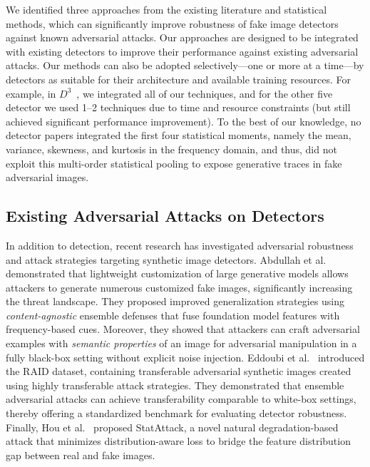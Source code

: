 \documentclass[letterpaper,twocolumn,10pt]{article}
\newcommand{\subhead}[1]{\vspace{1pt}\noindent{\textbf{#1.}}}
\begin{document}
\subhead{Novelty of our techniques}
We identified three approaches from the existing literature and statistical methods, which can significantly improve robustness of fake image detectors against known adversarial attacks. Our approaches are designed to be integrated with existing detectors to improve their performance against existing adversarial attacks. Our methods can also be adopted selectively---one or more at a time---by detectors as suitable for their architecture and available training resources.
For example, in $D^3$~\cite{yang2025d3}, we integrated all of our techniques, and for the other five detector we used 1--2 techniques due to time and resource constraints (but still achieved significant performance improvement). 
To the best of our knowledge, no detector papers integrated the first four statistical moments, namely the mean, variance, skewness,  and kurtosis 
in the frequency domain, and thus, did not exploit this multi-order statistical pooling to expose generative traces in fake adversarial images.

\subsection{Existing Adversarial Attacks on Detectors}
In addition to detection, recent research has investigated adversarial robustness and attack strategies targeting synthetic image detectors. Abdullah et al.~\cite{Sifat2024evolvingthreat} demonstrated that lightweight customization of large generative models allows attackers to generate numerous customized fake images, significantly increasing the threat landscape. They proposed improved generalization strategies using \emph{content-agnostic} ensemble defenses that fuse foundation model features with frequency-based cues. Moreover, they showed that attackers can craft adversarial examples with \emph{semantic properties} of an image for adversarial manipulation in a fully black-box setting without explicit noise injection. Eddoubi et al.~\cite{eddoubi2025raiddatasettestingadversarial} introduced the RAID dataset, containing transferable adversarial synthetic images created using highly transferable attack strategies. They demonstrated that ensemble adversarial attacks can achieve transferability comparable to white-box settings, thereby offering a standardized benchmark for evaluating detector robustness. Finally, Hou et al.~\cite{Hou2023adversarial} proposed StatAttack, a novel natural degradation-based attack that minimizes distribution-aware loss to bridge the feature distribution gap between real and fake images. 
\end{document}
